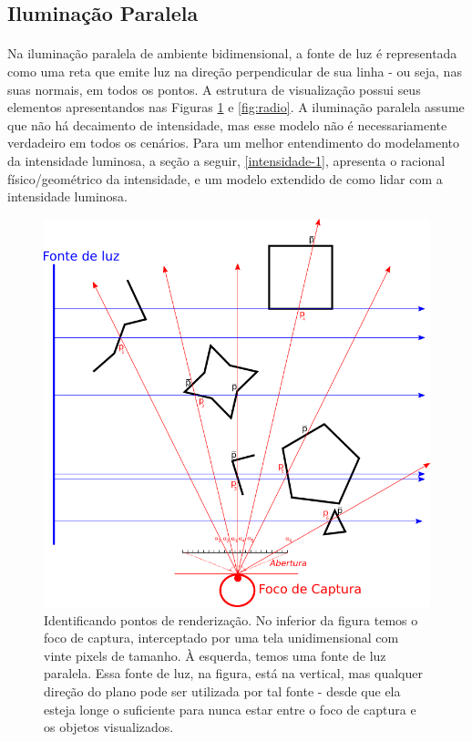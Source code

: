 \documentclass{article}
\begin{document}
	\subsection{Iluminação Paralela}
	
	\paragraph{}
	Na iluminação paralela de ambiente bidimensional, a fonte de luz é representada como uma reta que emite luz na direção perpendicular de sua linha - ou seja, nas suas normais, em todos os pontos. A estrutura de visualização possui seus elementos apresentandos nas Figuras \ref{fig:rend} e \ref{fig:radio}. A iluminação paralela assume que não há decaimento de intensidade, mas esse modelo não é necessariamente verdadeiro em todos os cenários. Para um melhor entendimento do modelamento da intensidade luminosa, a seção a seguir, \ref{intensidade-1}, apresenta o racional físico/geométrico da intensidade, e um modelo extendido de como lidar com a intensidade luminosa.
	
	\begin{figure}[h]
		\centering
		\includegraphics[scale=0.7]{Renderizacao-2D-1D}
		\caption{Identificando pontos de renderização. No inferior da figura temos o foco de captura, interceptado por uma tela unidimensional com vinte pixels de tamanho. À esquerda, temos uma fonte de luz paralela. Essa fonte de luz, na figura, está na vertical, mas qualquer direção do plano pode ser utilizada por tal fonte - desde que ela esteja longe o suficiente para nunca estar entre o foco de captura e os objetos visualizados.}
		\label{fig:rend}
	\end{figure}
\end{document}
